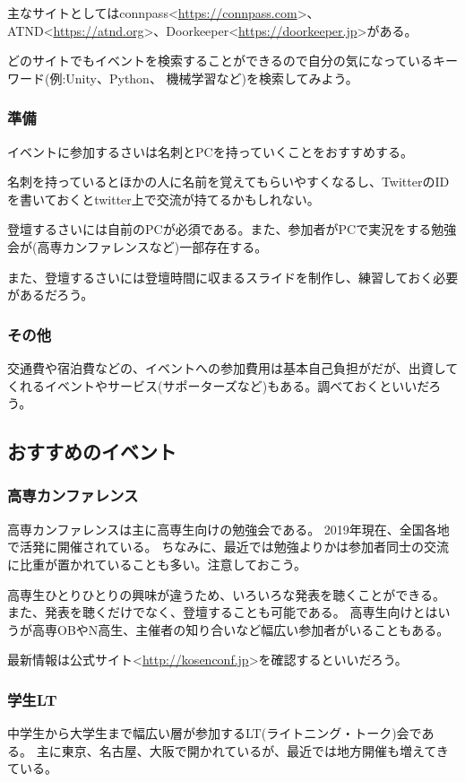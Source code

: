 \documentclass[lualatex,ja=standard,12pt,a4j]{bxjsbook}
\begin{document}
					主なサイトとしてはconnpass<\url{https://connpass.com}>、ATND<\url{https://atnd.org}>、Doorkeeper<\url{https://doorkeeper.jp}>がある。
					
					どのサイトでもイベントを検索することができるので自分の気になっているキーワード(例:Unity、Python、 機械学習など)を検索してみよう。
				\subsubsection{準備}
					イベントに参加するさいは名刺とPCを持っていくことをおすすめする。
					
					名刺を持っているとほかの人に名前を覚えてもらいやすくなるし、TwitterのIDを書いておくとtwitter上で交流が持てるかもしれない。
					
					登壇するさいには自前のPCが必須である。また、参加者がPCで実況をする勉強会が(高専カンファレンスなど)一部存在する。
					
					また、登壇するさいには登壇時間に収まるスライドを制作し、練習しておく必要があるだろう。
					
					\subsubsection{その他}
						交通費や宿泊費などの、イベントへの参加費用は基本自己負担がだが、出資してくれるイベントやサービス(サポーターズなど)もある。調べておくといいだろう。
			\subsection{おすすめのイベント}
				\subsubsection{高専カンファレンス}
					高専カンファレンスは主に高専生向けの勉強会である。
					2019年現在、全国各地で活発に開催されている。
					ちなみに、最近では勉強よりかは参加者同士の交流に比重が置かれていることも多い。注意しておこう。
					
					高専生ひとりひとりの興味が違うため、いろいろな発表を聴くことができる。
					また、発表を聴くだけでなく、登壇することも可能である。
					高専生向けとはいうが高専OBやN高生、主催者の知り合いなど幅広い参加者がいることもある。
					
					最新情報は公式サイト<\url{http://kosenconf.jp}>を確認するといいだろう。
				\subsubsection{学生LT}
					中学生から大学生まで幅広い層が参加するLT(ライトニング・トーク)会である。
					主に東京、名古屋、大阪で開かれているが、最近では地方開催も増えてきている。
					
\end{document}
